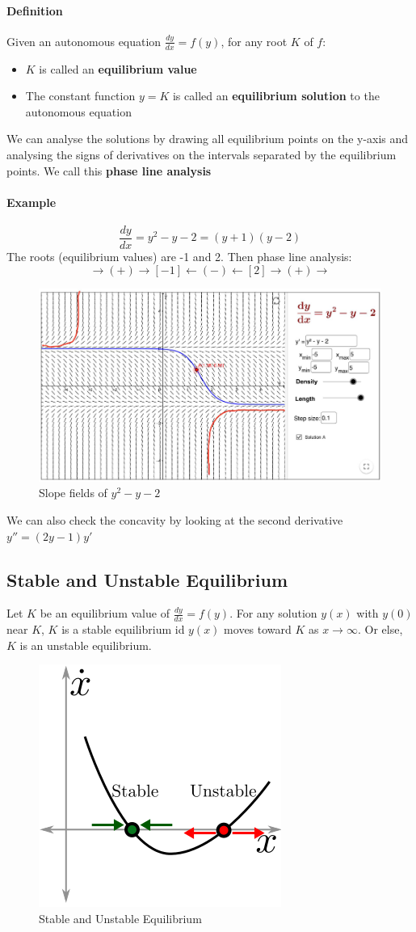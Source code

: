 \documentclass[12pt]{article}
\begin{document}
\paragraph{Definition}
Given an autonomous equation $\frac{dy}{dx} = f(y)$, for any root $K$ of $f$:
\begin{itemize} 
     \item $K$ is called an \textbf{equilibrium value}
     \item The constant function $y = K$ is called an \textbf{equilibrium solution} to the autonomous equation
\end{itemize}
We can analyse the solutions by drawing all equilibrium points on the y-axis and analysing the signs of derivatives on the intervals
separated by the equilibrium points. We call this \textbf{phase line analysis}

\paragraph{Example}
\[
    \frac{dy}{dx} = y^2 - y - 2 = (y + 1)(y - 2)
\]
The roots (equilibrium values) are -1 and 2. Then phase line analysis:
\[
    \rightarrow( + )\rightarrow[ - 1] \leftarrow( -)\leftarrow [2]\rightarrow ( +)\rightarrow 
\]
\begin{figure}[H]
     \centering
     \includegraphics[width = 0.6\linewidth]{Images/phase line analysis.png}
     \caption{Slope fields of $y^2 - y - 2$}
\end{figure}
We can also check the concavity by looking at the second derivative $y'' = (2y-1)y'$
\subsection{Stable and Unstable Equilibrium}
Let $K$ be an equilibrium value of $\frac{dy}{dx} = f(y)$. For any solution $y(x)$ with $y(0)$ near $K$,
$K$ is a stable equilibrium id $y(x)$ moves toward $K$ as $x \to \infty$. Or else, $K$ is an unstable equilibrium.
\begin{figure} 
     \centering
     \includegraphics[width = 0.3\linewidth]{Images/equilibrium.png}
     \caption{Stable and Unstable Equilibrium}
\end{figure}
\end{document}
